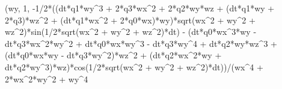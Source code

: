 \documentclass[]{article}
\newenvironment{Shaded}{}{}
\newcommand{\DecValTok}[1]{\textcolor[rgb]{0.25,0.63,0.44}{#1}}
\newcommand{\OperatorTok}[1]{\textcolor[rgb]{0.40,0.40,0.40}{#1}}
\newcommand{\NormalTok}[1]{#1}
\begin{document}
\begin{Shaded}
\begin{Highlighting}[]
\NormalTok{(wy, }\DecValTok{1}\NormalTok{, }\OperatorTok{-}\DecValTok{1}\OperatorTok{/}\DecValTok{2}\OperatorTok{*}\NormalTok{((dt}\OperatorTok{*}\NormalTok{q1}\OperatorTok{*}\NormalTok{wy}\OperatorTok{^}\DecValTok{3} \OperatorTok{+} \DecValTok{2}\OperatorTok{*}\NormalTok{q3}\OperatorTok{*}\NormalTok{wx}\OperatorTok{^}\DecValTok{2} \OperatorTok{+} \DecValTok{2}\OperatorTok{*}\NormalTok{q2}\OperatorTok{*}\NormalTok{wy}\OperatorTok{*}\NormalTok{wz }\OperatorTok{+}\NormalTok{ (dt}\OperatorTok{*}\NormalTok{q1}\OperatorTok{*}\NormalTok{wy }\OperatorTok{+} \DecValTok{2}\OperatorTok{*}\NormalTok{q3)}\OperatorTok{*}\NormalTok{wz}\OperatorTok{^}\DecValTok{2} \OperatorTok{+}\NormalTok{ (dt}\OperatorTok{*}\NormalTok{q1}\OperatorTok{*}\NormalTok{wx}\OperatorTok{^}\DecValTok{2} \OperatorTok{+} \DecValTok{2}\OperatorTok{*}\NormalTok{q0}\OperatorTok{*}\NormalTok{wx)}\OperatorTok{*}\NormalTok{wy)}\OperatorTok{*}\NormalTok{sqrt(wx}\OperatorTok{^}\DecValTok{2} \OperatorTok{+}\NormalTok{ wy}\OperatorTok{^}\DecValTok{2} \OperatorTok{+}\NormalTok{ wz}\OperatorTok{^}\DecValTok{2}\NormalTok{)}\OperatorTok{*}\NormalTok{sin(}\DecValTok{1}\OperatorTok{/}\DecValTok{2}\OperatorTok{*}\NormalTok{sqrt(wx}\OperatorTok{^}\DecValTok{2} \OperatorTok{+}\NormalTok{ wy}\OperatorTok{^}\DecValTok{2} \OperatorTok{+}\NormalTok{ wz}\OperatorTok{^}\DecValTok{2}\NormalTok{)}\OperatorTok{*}\NormalTok{dt) }\OperatorTok{-}\NormalTok{ (dt}\OperatorTok{*}\NormalTok{q0}\OperatorTok{*}\NormalTok{wx}\OperatorTok{^}\DecValTok{3}\OperatorTok{*}\NormalTok{wy }\OperatorTok{-}\NormalTok{ dt}\OperatorTok{*}\NormalTok{q3}\OperatorTok{*}\NormalTok{wx}\OperatorTok{^}\DecValTok{2}\OperatorTok{*}\NormalTok{wy}\OperatorTok{^}\DecValTok{2} \OperatorTok{+}\NormalTok{ dt}\OperatorTok{*}\NormalTok{q0}\OperatorTok{*}\NormalTok{wx}\OperatorTok{*}\NormalTok{wy}\OperatorTok{^}\DecValTok{3} \OperatorTok{-}\NormalTok{ dt}\OperatorTok{*}\NormalTok{q3}\OperatorTok{*}\NormalTok{wy}\OperatorTok{^}\DecValTok{4} \OperatorTok{+}\NormalTok{ dt}\OperatorTok{*}\NormalTok{q2}\OperatorTok{*}\NormalTok{wy}\OperatorTok{*}\NormalTok{wz}\OperatorTok{^}\DecValTok{3} \OperatorTok{+}\NormalTok{ (dt}\OperatorTok{*}\NormalTok{q0}\OperatorTok{*}\NormalTok{wx}\OperatorTok{*}\NormalTok{wy }\OperatorTok{-}\NormalTok{ dt}\OperatorTok{*}\NormalTok{q3}\OperatorTok{*}\NormalTok{wy}\OperatorTok{^}\DecValTok{2}\NormalTok{)}\OperatorTok{*}\NormalTok{wz}\OperatorTok{^}\DecValTok{2} \OperatorTok{+}\NormalTok{ (dt}\OperatorTok{*}\NormalTok{q2}\OperatorTok{*}\NormalTok{wx}\OperatorTok{^}\DecValTok{2}\OperatorTok{*}\NormalTok{wy }\OperatorTok{+}\NormalTok{ dt}\OperatorTok{*}\NormalTok{q2}\OperatorTok{*}\NormalTok{wy}\OperatorTok{^}\DecValTok{3}\NormalTok{)}\OperatorTok{*}\NormalTok{wz)}\OperatorTok{*}\NormalTok{cos(}\DecValTok{1}\OperatorTok{/}\DecValTok{2}\OperatorTok{*}\NormalTok{sqrt(wx}\OperatorTok{^}\DecValTok{2} \OperatorTok{+}\NormalTok{ wy}\OperatorTok{^}\DecValTok{2} \OperatorTok{+}\NormalTok{ wz}\OperatorTok{^}\DecValTok{2}\NormalTok{)}\OperatorTok{*}\NormalTok{dt))}\OperatorTok{/}\NormalTok{(wx}\OperatorTok{^}\DecValTok{4} \OperatorTok{+} \DecValTok{2}\OperatorTok{*}\NormalTok{wx}\OperatorTok{^}\DecValTok{2}\OperatorTok{*}\NormalTok{wy}\OperatorTok{^}\DecValTok{2} \OperatorTok{+}\NormalTok{ wy}\OperatorTok{^}\DecValTok{4} 
\end{Highlighting}
\end{Shaded}
\end{document}
